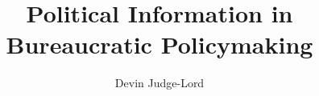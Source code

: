 \documentclass{article}
\title{Political Information in Bureaucratic Policymaking}
\author{Devin Judge-Lord} %
\begin{document}

\maketitle



% 

% 
% 
% 




% 






\singlespace
\small
 

\end{document}
